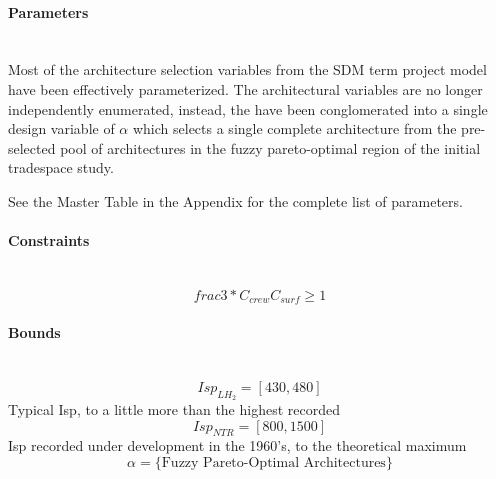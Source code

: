 \documentclass[11pt]{article} %
\newcommand{\myparagraph}[1]{\paragraph{#1}\mbox{}\\}
\begin{document}
\myparagraph{Parameters}

Most of the architecture selection variables from the SDM term project model have been effectively parameterized.  The architectural variables are no longer independently enumerated, instead, the have been conglomerated into a single design variable of $\alpha$ which selects a single complete architecture from the pre-selected pool of architectures in the fuzzy pareto-optimal region of the initial tradespace study.

See the Master Table in the Appendix for the complete list of parameters.

\myparagraph{Constraints}

\begin{equation}
frac{3 * C_{crew}}{C_{surf}} \ge 1
\end{equation}

\myparagraph{Bounds}

\begin{equation*}
Isp_{LH_2}=[430,480]
\end{equation*}
Typical Isp, to a little more than the highest recorded
\begin{equation*}
Isp_{NTR}=[800,1500]
\end{equation*}
Isp recorded under development in the 1960's, to the theoretical maximum
\begin{equation*}
\alpha = \{\mbox{Fuzzy Pareto-Optimal Architectures}\}
\end{equation*}

\clearpage
\end{document}
